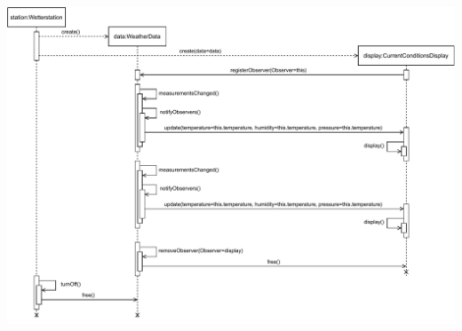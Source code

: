 \documentclass{abgabe}
\begin{document}
\begin{questions}
    \begin{solution}
        \begin{center}
            \includegraphics[width=\textwidth]{swt_h09_weather.pdf}
        \end{center}
    \end{solution}

\end{questions}
\end{document}
